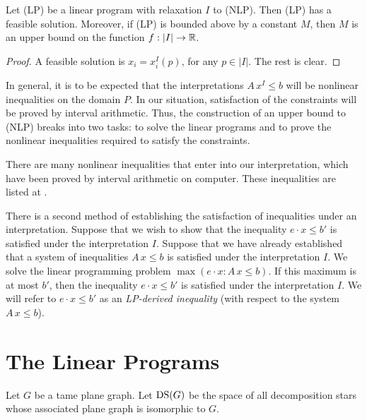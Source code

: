 \begin{lemma}
\label{lemma:bound} Let (LP) be a linear program with relaxation $I$ to
(NLP). Then (LP) has a feasible solution.  Moreover, if (LP) is bounded
above by a constant $M$, then $M$ is an upper bound on the function
$f:|I|\to{\mathbb R}$.
\end{lemma}

\begin{proof}
A feasible solution is $x_i = x_i^I(p)$, for any $p\in |I|$. The rest is
clear.
\end{proof}

\begin{remark}  In general, it is to be expected that the
interpretations $A\,x^I \le b$ will be nonlinear inequalities on
the domain $P$.  In our situation, satisfaction of the constraints
will be proved by interval arithmetic.  Thus, the construction of
an upper bound to (NLP) breaks into two tasks: to solve the linear
programs and to prove the nonlinear inequalities required to
satisfy the constraints.
\end{remark}

There are many nonlinear inequalities that enter into our
interpretation, which have been proved by interval arithmetic on
computer.  These inequalities are listed at \cite{web}.

\begin{remark}
\label{remark:derived} There is a second method of establishing the
satisfaction of inequalities under an interpretation. Suppose that we
wish to show that the inequality $e\cdot x\le b'$ is satisfied under the
interpretation $I$. Suppose that we have already established that a
system of inequalities $A\,x\le b$ is satisfied under the interpretation
$I$.  We solve the linear programming problem $\max(e\cdot x : A\,x\le
b)$.  If this maximum is at most $b'$, then the inequality $e\cdot x\le
b'$ is satisfied under the interpretation $I$.  We will refer to $e\cdot
x\le b'$ as an {\it LP-derived inequality} (with respect to the system
$A\,x\le b$).
%
\end{remark}


\section{The Linear Programs}

Let $G$ be a tame plane graph. Let ${\operatorname{DS}}(G)$ be the space of
all decomposition stars whose associated plane graph is isomorphic
to $G$.
%

